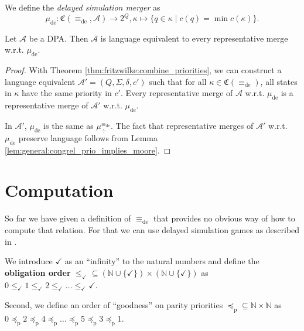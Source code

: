\begin{defn}
	We define the \emph{delayed simulation merger} as $$\mu_\text{de} : \mathfrak{C}(\equiv_\text{de}, \mathcal{A}) \rightarrow 2^Q, \kappa \mapsto \{ q \in \kappa \mid c(q) = \min c(\kappa) \}.$$
\end{defn}

\begin{cor}
	Let $\mathcal{A}$ be a DPA. Then $\mathcal{A}$ is language equivalent to every representative merge w.r.t. $\mu_\text{de}$.
\end{cor}

\begin{proof}
	With Theorem \ref{thm:fritzwilke:combine_priorities}, we can construct a language equivalent $\mathcal{A}' = (Q, \Sigma, \delta, c')$ such that for all $\kappa \in \mathfrak{C}(\equiv_\text{de})$, all states in $\kappa$ have the same priority in $c'$. Every representative merge of $\mathcal{A}$ w.r.t. $\mu_\text{de}$ is a representative merge of $\mathcal{A}'$ w.r.t. $\mu_\text{de}$.
	
	In $\mathcal{A}'$, $\mu_\text{de}$ is the same as $\mu^{\equiv_\text{de}}_\div$. The fact that representative merges of $\mathcal{A}'$ w.r.t. $\mu_\text{de}$ preserve language follows from Lemma \ref{lem:general:congrel_prio_implies_moore}.
\end{proof}



\section{Computation}
So far we have given a definition of $\equiv_\text{de}$ that provides no obvious way of how to compute that relation. For that we can use delayed simulation games as described in \cite{FritzWilke06}.

\begin{defn}
	We introduce $\checkmark$ as an \enquote{infinity} to the natural numbers and define the \textbf{obligation order} $\leq_\checkmark \subseteq (\mathbb{N} \cup \{\checkmark\}) \times (\mathbb{N} \cup \{\checkmark\})$ as $0 \leq_\checkmark 1 \leq_\checkmark 2 \leq_\checkmark \dots \leq_\checkmark \checkmark$.
	
	Second, we define an order of \enquote{goodness} on parity priorities $\preceq_\text{p} \subseteq \mathbb{N} \times \mathbb{N}$ as $0 \preceq_\text{p} 2 \preceq_\text{p} 4 \preceq_\text{p} \dots \preceq_\text{p} 5 \preceq_\text{p} 3 \preceq_\text{p} 1$.
\end{defn}

